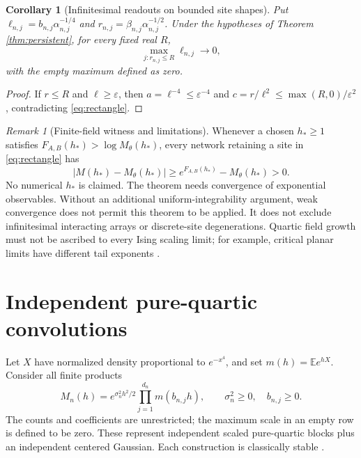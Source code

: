 \documentclass[11pt]{article}
\newtheorem{corollary}[theorem]{Corollary}
\theoremstyle{remark}
\newtheorem{remark}[theorem]{Remark}
\newcommand{\E}{\mathbb E}
\numberwithin{equation}{section}
\begin{document}
\begin{corollary}[Infinitesimal readouts on bounded site shapes]
\label{cor:infinitesimal}
Put
\(\ell_{n,j}=b_{n,j}\alpha_{n,j}^{-1/4}\) and
\(r_{n,j}=\beta_{n,j}\alpha_{n,j}^{-1/2}\).
Under the hypotheses of Theorem \ref{thm:persistent}, for every fixed
real \(R\),
\begin{equation}\label{eq:small-site}
 \max_{j:r_{n,j}\le R}\ell_{n,j}\longrightarrow0,
\end{equation}
with the empty maximum defined as zero.
\end{corollary}
\begin{proof}
If \(r\le R\) and \(\ell\ge\varepsilon\), then
\(a=\ell^{-4}\le\varepsilon^{-4}\) and
\(c=r/\ell^2\le\max(R,0)/\varepsilon^2\), contradicting
\eqref{eq:rectangle}.
\end{proof}

\begin{remark}[Finite-field witness and limitations]\label{rem:gap}
Whenever a chosen \(h_*\ge1\) satisfies
\(F_{A,B}(h_*)>\log M_\theta(h_*)\), every network retaining a site
in \eqref{eq:rectangle} has
\[
 |M(h_*)-M_\theta(h_*)|
 \ge e^{F_{A,B}(h_*)}-M_\theta(h_*)>0.
\]
No numerical \(h_*\) is claimed. The theorem needs convergence of
exponential observables. Without an additional uniform-integrability
argument, weak convergence does not permit this theorem to be applied.
It does not exclude infinitesimal interacting arrays or discrete-site
degenerations. Quartic field growth must not be ascribed to every Ising
scaling limit; for example, critical planar limits have different tail
exponents \cite{cgn}.
\end{remark}

\section{Independent pure-quartic convolutions}\label{sec:indquartic}

Let \(X\) have normalized density proportional to \(e^{-x^4}\), and set
\(m(h)=\E e^{hX}\). Consider all finite products
\begin{equation}\label{eq:pure-products}
 M_n(h)=e^{\sigma_n^2h^2/2}\prod_{j=1}^{d_n}m(b_{n,j}h),
 \qquad \sigma_n^2\ge0,\quad b_{n,j}\ge0.
\end{equation}
The counts and coefficients are unrestricted; the maximum scale in an
empty row is defined to be zero. These represent independent
scaled pure-quartic blocks plus an independent centered Gaussian.
Each construction is classically stable \cite{sg,fr}.
\end{document}
